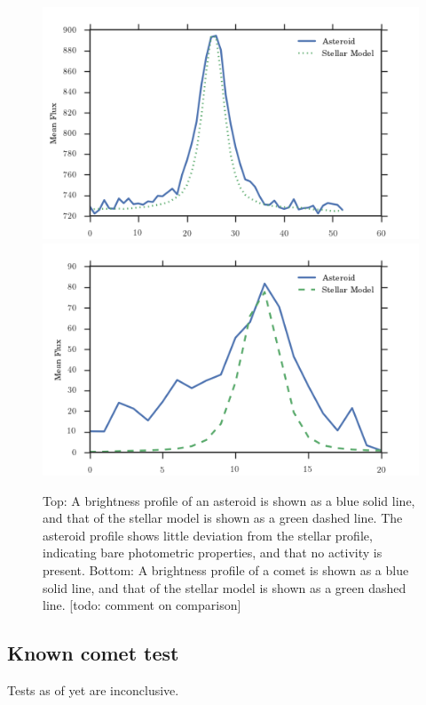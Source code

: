 \documentclass[iop,apj]{emulateapj}
\begin{document}
\begin{figure}[!htb]
    \centering
    \includegraphics[width=\linewidth]{images/asteroid_psf_broad_10477.png}
    \includegraphics[width=\linewidth]{images/comet_psf3.png}
    \caption{Top: A brightness profile of an asteroid is shown as a blue solid line, and that of the stellar model is shown as a green dashed line. The asteroid profile shows little deviation from the stellar profile, indicating bare photometric properties, and that no activity is present. Bottom: A brightness profile of a comet is shown as a blue solid line, and that of the stellar model is shown as a green dashed line. [todo: comment on comparison]}
    \label{fig:4}
\end{figure}

\subsection{Known comet test }

Tests as of yet are inconclusive.
\end{document}
